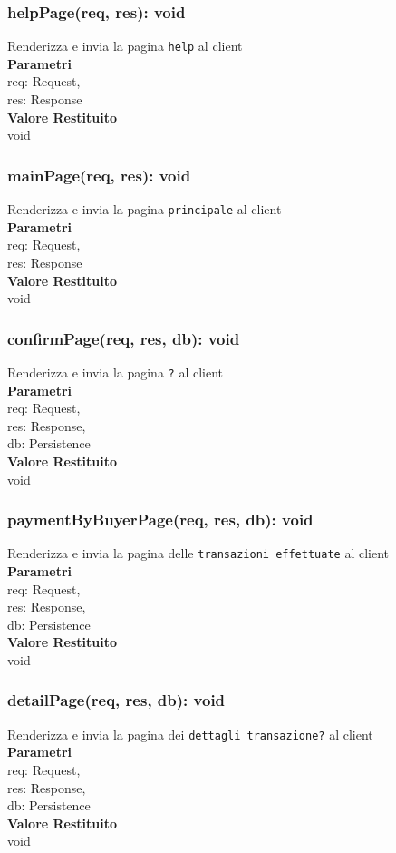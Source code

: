 \documentclass[a4paper, 12pt]{article}
\begin{document}
\subsubsection{helpPage(req, res): void}
Renderizza e invia la pagina \texttt{help} al client\\
\textbf{Parametri}\\
req: Request,\\
res: Response\\
\textbf{Valore Restituito}\\
void
\subsubsection{mainPage(req, res): void}
Renderizza e invia la pagina \texttt{principale} al client\\
\textbf{Parametri}\\
req: Request,\\
res: Response\\
\textbf{Valore Restituito}\\
void
\subsubsection{confirmPage(req, res, db): void}
Renderizza e invia la pagina \texttt{?} al client\\
\textbf{Parametri}\\
req: Request,\\
res: Response,\\
db: Persistence\\
\textbf{Valore Restituito}\\
void
\subsubsection{paymentByBuyerPage(req, res, db): void}
Renderizza e invia la pagina delle \texttt{transazioni effettuate} al client\\
\textbf{Parametri}\\
req: Request,\\
res: Response,\\
db: Persistence\\
\textbf{Valore Restituito}\\
void
\subsubsection{detailPage(req, res, db): void}
Renderizza e invia la pagina dei \texttt{dettagli transazione?} al client\\
\textbf{Parametri}\\
req: Request,\\
res: Response,\\
db: Persistence\\
\textbf{Valore Restituito}\\
void
\end{document}
